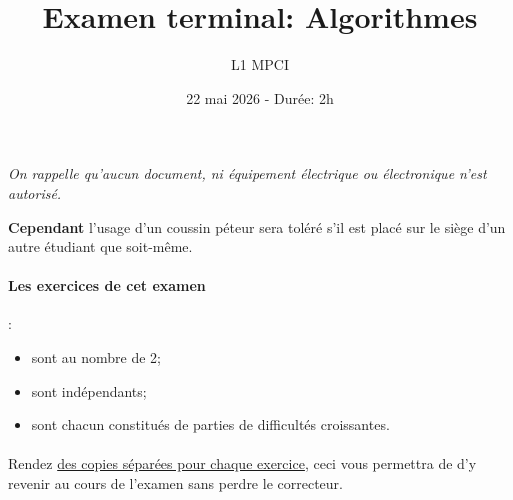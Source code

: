 \documentclass{article}
\title{Examen terminal: Algorithmes}
\author{L1 MPCI}
\date{22 mai 2026 - Durée: 2h}
\theoremstyle{exostyle}
\theoremstyle{partiestyle}
\theoremstyle{questionstyle}
\begin{document}
\maketitle

\begin{center}
{\em On rappelle qu'aucun document, ni équipement électrique ou électronique n'est autorisé.

 {\bf Cependant} l'usage d'un coussin péteur sera toléré s'il est placé sur le siège d'un autre étudiant que soit-même.}
\end{center}


\vspace*{1cm}

\paragraph{Les exercices de cet examen} :
\begin{itemize}
\item sont au nombre de 2;
\item sont indépendants;
\item sont chacun constitués de parties de difficultés croissantes.
\end{itemize}


\paragraph{}{\large \sc Rendez \underline{des copies séparées pour chaque exercice}, ceci vous permettra de d'y revenir au cours de l'examen sans perdre le correcteur.}


\clearpage
\end{document}

